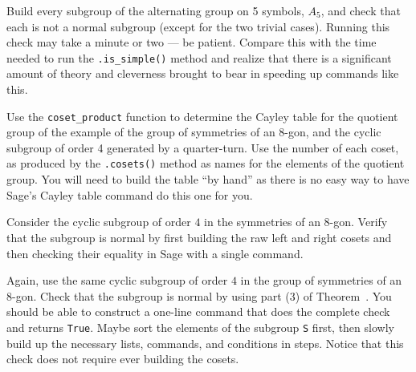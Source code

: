 \begin{sageverbatim}\end{sageverbatim}
%
%
Build every subgroup of the alternating group on 5 symbols, $A_5$, and check that each is not a normal subgroup (except for the two trivial cases).  Running this check may take a minute or two --- be patient.  Compare this with the time needed to run the \verb?.is_simple()? method and realize that there is a significant amount of theory and cleverness brought to bear in speeding up commands like this.
\begin{sageverbatim}\end{sageverbatim}
%
%
Use the \verb?coset_product? function to determine the Cayley table for the quotient group of the example of the group of symmetries of an 8-gon, and the cyclic subgroup of order 4 generated by a quarter-turn.  Use the number of each coset, as produced by the \verb?.cosets()? method as names for the elements of the quotient group.  You will need to build the table ``by hand'' as there is no easy way to have Sage's Cayley table command do this one for you.
\begin{sageverbatim}\end{sageverbatim}
%
%
Consider  the cyclic subgroup of order $4$ in the symmetries of an 8-gon.  Verify that the subgroup is normal by first building the raw left and right cosets and then checking their equality in Sage with a single command.
\begin{sageverbatim}\end{sageverbatim}
%
%
Again, use the same cyclic subgroup of order $4$ in the group of symmetries of an 8-gon.  Check that the subgroup is normal by using part (3) of Theorem~.  You should be able to construct a one-line command that does the complete check and returns \verb?True?.  Maybe sort the elements of the subgroup \verb?S? first, then slowly build up the necessary lists, commands, and conditions in steps.  Notice that this check does not require ever building the cosets.
\begin{sageverbatim}\end{sageverbatim}
